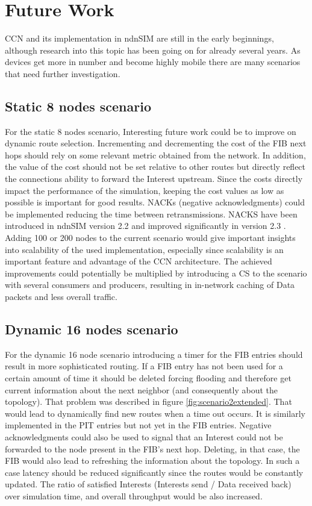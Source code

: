 \section{Future Work}

CCN and its implementation in ndnSIM are still in the early beginnings, although research into this topic has been going on for already several years. As devices get more in number and become highly mobile there are many scenarios that need further investigation.

\subsection{Static 8 nodes scenario}

For the static 8 nodes scenario, Interesting future work could be to improve on dynamic route selection. Incrementing and decrementing the cost of the FIB next hops should rely on some relevant metric obtained from the network. In addition, the value of the cost should not be set relative to other routes but directly reflect the connections ability to forward the Interest upstream. Since the costs directly impact the performance of the simulation, keeping the cost values as low as possible is important for good results. NACKs (negative acknowledgments) could be implemented reducing the time between retransmissions. NACKS have been introduced in ndnSIM version 2.2 and improved significantly in version 2.3 \cite{ndnSIMreleaseNotes}. Adding 100 or 200 nodes to the current scenario would give important insights into scalability of the used implementation, especially since scalability is an important feature and advantage of the CCN architecture. The achieved improvements could potentially be multiplied by introducing a CS to the scenario with several consumers and producers, resulting in in-network caching of Data packets and less overall traffic.

\subsection{Dynamic 16 nodes scenario}

For the dynamic 16 node scenario introducing a timer for the FIB entries should result in more sophisticated routing. If a FIB entry has not been used for a certain amount of time it should be deleted forcing flooding and therefore get current information about the next neighbor (and consequently about the topology). That problem was described in figure \ref{fig:scenario2extended}. That would lead to dynamically find new routes when a time out occurs. It is similarly implemented in the PIT entries but not yet in the FIB entries. Negative acknowledgments could also be used to signal that an Interest could not be forwarded to the node present in the FIB's next hop. Deleting, in that case, the FIB would also lead to refreshing the information about the topology. In such a case latency should be reduced significantly since the routes would be constantly updated. The ratio of satisfied Interests (Interests send / Data received back) over simulation time, and overall throughput would be also increased.






